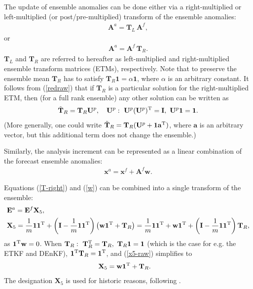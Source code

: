 \documentclass[11pt]{report}
\newcommand{\mb} {\mathbf}
\newcommand{\T}{^{\tiny \mathrm T}}
\begin{document}
The update of ensemble anomalies can be done either via a right-multiplied or left-multiplied (or post/pre-multiplied) transform of the ensemble anomalies:
\begin{align}
  \label{T-left}
  \mb A^a = \mb T_L \,\mb A^f,
\end{align}
or
\begin{align}
  \label{T-right}
  \mb A^a = \mb A^f \, \mb T_R.
\end{align}
$\mb T_L$ and $\mb T_R$ are referred to hereafter as left-multiplied and right-multiplied ensemble transform matrices (ETMs), respectively.
Note that to preserve the ensemble mean $\mb T_R$ has to satisfy $\mb T_R \mb 1 = \alpha \mb 1$, where $\alpha$ is an arbitrary constant.
It follows from (\ref{redraw}) that if $\mb T_R$ is a particular solution for the right-multiplied ETM, then (for a full rank ensemble) any other solution can be written as
\begin{align}
  \label{TR-all}
  \tilde{\mb T}_R = \mb T_R \mb U^p, \quad \mb U^p:\ \mb U^p (\mb U^p)\T = \mb I,\ \mb U^p \mb 1 = \mb 1.
\end{align}
(More generally, one could write $\tilde{\mb T}_R = \mb T_R (\mb U^p + \mb 1 \mb a\T)$, where $\mb a$ is an arbitrary vector, but this additional term does not change the ensemble.)

Similarly, the analysis increment can be represented as a linear combination of the forecast ensemble anomalies:
\begin{align}
  \label{w}
  \mb x^a = \mb x^f + \mb A^f \mb w.
\end{align}

Equations (\ref{T-right}) and (\ref{w}) can be combined into a single transform of the ensemble:
\begin{align}
  \label{x5-def}
  & \mb E^a = \mb E^f \mb X_5,\\
  \label{x5-raw}
  & \mb X_5 = \frac{1}{m} \mb 1 \mb 1\T + \left( \mb I - \frac{1}{m} \mb 1 \mb 1\T\right) \left( \mb w \mb 1\T + \mb T_R\right)
  = \frac{1}{m} \mb 1 \mb 1\T + \mb w \mb 1\T + \left( \mb I - \frac{1}{m} \mb 1 \mb 1\T \right) \mb T_R,
\end{align}
as $\mb 1\T \mb w = 0$. 
When $\mb T_R:\ \mb T_R\T = \mb T_R,\ \mb T_R \mb 1 = \mb 1$ (which is the case for e.g. the ETKF and DEnKF), $\mb 1\T \mb T_R = \mb 1\T$, and (\ref{x5-raw}) simplifies to
\begin{align}
  \label{x5}
  & \mb X_5 = \mb w \mb 1\T + \mb T_R.
\end{align}
The designation $\mb X_5$ is used for historic reasons, following \citet{eve03a}.
\end{document}

